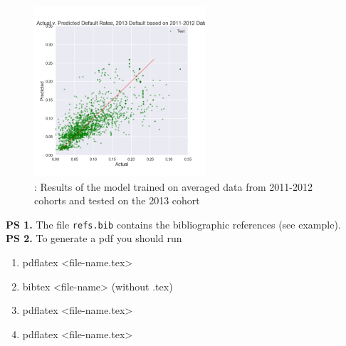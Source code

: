 \documentclass[10pt,twocolumn]{article}
\begin{document}
\begin{figure}[!t]
  \begin{center}
    \includegraphics[width=2.5in]{2013from2011.png}
  \end{center}

  \caption{: Results of the model trained on averaged data from 2011-2012 cohorts
  and tested on the 2013 cohort}
  \label{resultsavg}
\end{figure}

\noindent\textbf{PS 1.} The file \texttt{refs.bib} contains the bibliographic references (see example).\\

\noindent\textbf{PS 2.} To generate a pdf you should run
\begin{enumerate}
\item pdflatex <file-name.tex>
\item bibtex <file-name> (without .tex)
\item pdflatex <file-name.tex>
\item pdflatex <file-name.tex>
\end{enumerate}




\end{document}
